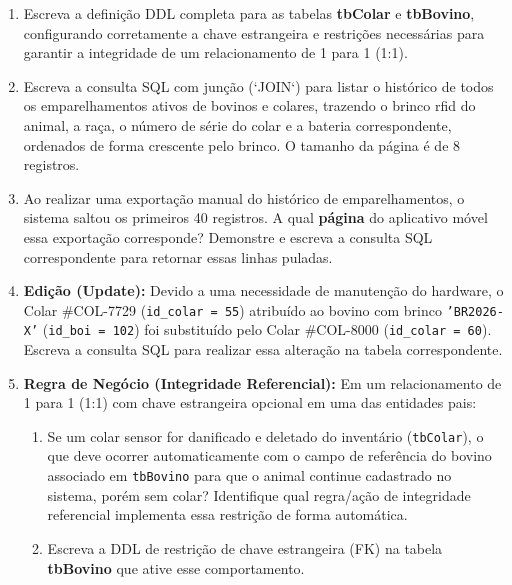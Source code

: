 \documentclass[12pt,a4paper]{article}
\newcommand{\resposta}[1]{}
\begin{document}
\vspace{0.4cm}

\begin{enumerate}[label=\textbf{\alph*)}]
    \item Escreva a definição DDL completa para as tabelas \textbf{tbColar} e \textbf{tbBovino}, configurando corretamente a chave estrangeira e restrições necessárias para garantir a integridade de um relacionamento de 1 para 1 (1:1).
    \resposta{5cm}
    
    \item Escreva a consulta SQL com junção (`JOIN`) para listar o histórico de todos os emparelhamentos ativos de bovinos e colares, trazendo o brinco rfid do animal, a raça, o número de série do colar e a bateria correspondente, ordenados de forma crescente pelo brinco. O tamanho da página é de 8 registros.
    \resposta{4cm}

    \item Ao realizar uma exportação manual do histórico de emparelhamentos, o sistema saltou os primeiros 40 registros. A qual \textbf{página} do aplicativo móvel essa exportação corresponde? Demonstre e escreva a consulta SQL correspondente para retornar essas linhas puladas.
    \resposta{2.5cm}

    \item \textbf{Edição (Update):} Devido a uma necessidade de manutenção do hardware, o Colar \#COL-7729 (\texttt{id\_colar = 55}) atribuído ao bovino com brinco \texttt{'BR2026-X'} (\texttt{id\_boi = 102}) foi substituído pelo Colar \#COL-8000 (\texttt{id\_colar = 60}). Escreva a consulta SQL para realizar essa alteração na tabela correspondente.
    \resposta{2.5cm}

    \item \textbf{Regra de Negócio (Integridade Referencial):} Em um relacionamento de 1 para 1 (1:1) com chave estrangeira opcional em uma das entidades pais:
    \begin{enumerate}[label=\arabic*.]
        \item Se um colar sensor for danificado e deletado do inventário (\texttt{tbColar}), o que deve ocorrer automaticamente com o campo de referência do bovino associado em \texttt{tbBovino} para que o animal continue cadastrado no sistema, porém sem colar? Identifique qual regra/ação de integridade referencial implementa essa restrição de forma automática.
        \item Escreva a DDL de restrição de chave estrangeira (FK) na tabela \textbf{tbBovino} que ative esse comportamento.
    \end{enumerate}
    \resposta{4.5cm}
\end{enumerate}
\end{document}
